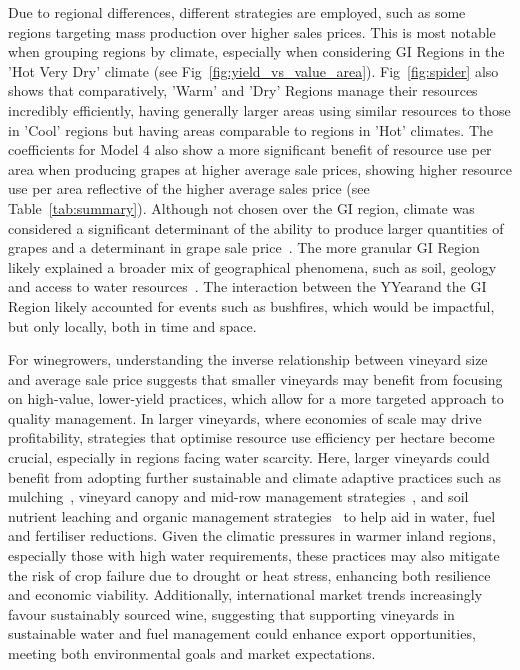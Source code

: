 \documentclass[10pt,letterpaper]{article}
\begin{document}
\par
Due to regional differences, different strategies are employed, such as some regions targeting mass production over higher sales prices. This is most notable when grouping regions by climate, especially when considering GI Regions in the 'Hot Very Dry' climate (see Fig~\ref{fig:yield_vs_value_area}). Fig~\ref{fig:spider} also shows that comparatively, 'Warm' and 'Dry' Regions manage their resources incredibly efficiently, having generally larger areas using similar resources to those in 'Cool' regions but having areas comparable to regions in 'Hot' climates. The coefficients for Model 4 also show a more significant benefit of resource use per area when producing grapes at higher average sale prices, showing higher resource use per area reflective of the higher average sales price (see Table~\ref{tab:summary}).
Although not chosen over the GI region, climate was considered a significant determinant of the ability to produce larger quantities of grapes and a determinant in grape sale price~\cite{agostaRegionalClimateVariability2012}. The more granular GI Region likely explained a broader mix of geographical phenomena, such as soil, geology and access to water resources~\cite{abbalDecisionSupportSystem2016,carmonaUseParticipatoryObjectOriented2011}. The interaction between the YYearand the GI Region likely accounted for events such as bushfires, which would be impactful, but only locally, both in time and space.
\par
For winegrowers, understanding the inverse relationship between vineyard size and average sale price suggests that smaller vineyards may benefit from focusing on high-value, lower-yield practices, which allow for a more targeted approach to quality management. In larger vineyards, where economies of scale may drive profitability, strategies that optimise resource use efficiency per hectare become crucial, especially in regions facing water scarcity. Here, larger vineyards could benefit from adopting further sustainable and climate adaptive practices such as mulching~\cite{rossertWoodchipsPotatoChips2022}, vineyard canopy and mid-row management strategies~\cite{delpuechAdaptingCoverCrop2018}, and soil nutrient leaching and organic management strategies~\cite{goslingLongtermChangesSoil2005, abadCoverCropsViticulture2021, moonenFunctionalBiodiversityAgroecosystem2008} to help aid in water, fuel and fertiliser reductions. Given the climatic pressures in warmer inland regions, especially those with high water requirements, these practices may also mitigate the risk of crop failure due to drought or heat stress, enhancing both resilience and economic viability. Additionally, international market trends increasingly favour sustainably sourced wine, suggesting that supporting vineyards in sustainable water and fuel management could enhance export opportunities, meeting both environmental goals and market expectations.
\end{document}
